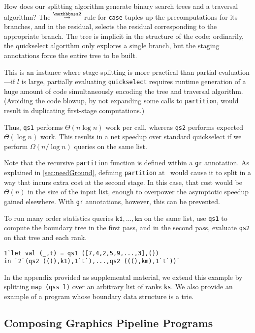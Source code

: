 How does our splitting algorithm generate binary search trees and a traversal
algorithm? The $\splittwosym$ rule for \texttt{case} tuples up the
precomputations for its branches, and in the residual, selects the residual
corresponding to the appropriate branch. The tree is implicit in the structure
of the code; ordinarily, the quickselect algorithm only explores a single
branch, but the staging annotations force the entire tree to be built.

This is an instance where stage-splitting is more practical than partial
evaluation---if $l$ is large, partially evaluating \texttt{quickselect} requires
runtime generation of a huge amount of code simultaneously encoding the tree and
traversal algorithm. (Avoiding the code blowup, by not expanding some calls to
\texttt{partition}, would result in duplicating first-stage computations.)

Thus, \texttt{qs1} performs $\Theta(n \log n)$ work per call, whereas
\texttt{qs2} performs expected $\Theta(\log n)$ work.  This results in a net
speedup over standard quickselect if we perform $\Omega(n / \log n)$ queries on
the same list. 

Note that the recursive \texttt{partition} function is defined within a \texttt{gr}
annotation.  As explained in \ref{sec:needGround}, defining \texttt{partition}
at \bbonem\ would cause it to split in a way that incurs extra cost at the second stage.
In this case, that cost would be $\Theta(n)$ in the size of the input list,
enough to overpower the asymptotic speedup gained elsewhere.
With \texttt{gr} annotations, however, this can be prevented.

To run many order statistics queries $\texttt{k1},\dots,\texttt{km}$ on the same
list, use \texttt{qs1} to compute the boundary tree in the first pass, and in
the second pass, evaluate \texttt{qs2} on that tree and each rank.
\begin{lstlisting}
1`let val (_,t) = qs1 ([7,4,2,5,9,...,3],())
in `2`(qs2 (((),k1),1`t`),...,qs2 (((),km),1`t`))`
\end{lstlisting}
%
In the appendix provided as supplemental material, we extend this example by
splitting \texttt{map (qss l)} over an arbitrary list of ranks \texttt{ks}. We also
provide an example of a program whose boundary data structure is a trie.

\subsection {Composing Graphics Pipeline Programs}

